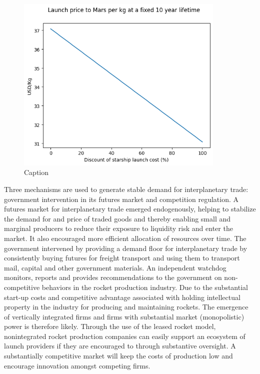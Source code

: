 \documentclass[fleqn,10pt]{Stylesheet} %
\begin{document}
\begin{figure}
    \centering
    \includegraphics[width=100mm]{fig_disclaunchflights.png}
    \caption{Caption}
    \label{fig:flight_cost}
\end{figure}


Three mechanisms are used to generate stable demand for interplanetary trade: government intervention in its futures market and competition regulation. A futures market for interplanetary trade emerged endogenously, helping to stabilize the demand for and price of traded goods and thereby enabling small and marginal producers to reduce their exposure to liquidity risk and enter the market. It also encouraged more efficient allocation of resources over time. The government intervened by providing a demand floor for interplanetary trade by consistently buying futures for freight transport and using them to transport mail, capital and other government materials. An independent watchdog monitors, reports and provides recommendations to the government on non-competitive behaviors in the rocket production industry. Due to the substantial start-up costs and competitive advantage associated with holding intellectual property in the industry for producing and maintaining rockets. The emergence of vertically integrated firms and firms with substantial market (monopolistic) power is therefore likely. Through the use of the leased rocket model, nonintegrated rocket production companies can easily support an ecosystem of launch providers if they are encouraged to through substantive oversight. A substantially competitive market will keep the costs of production low and encourage innovation amongst competing firms.
\end{document}
